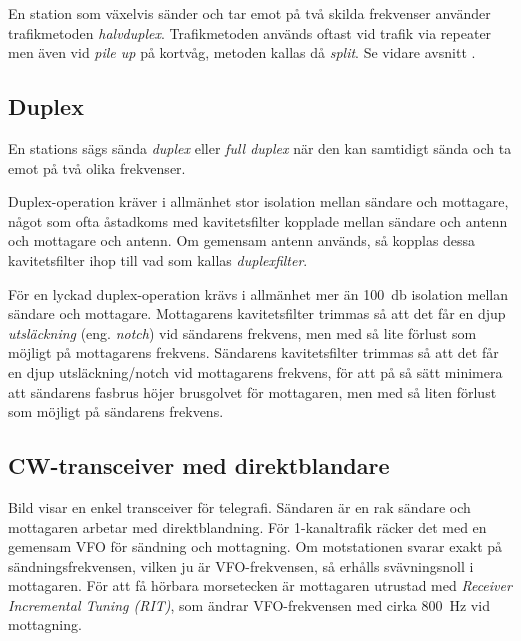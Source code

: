 En station som växelvis sänder och tar emot på två skilda frekvenser använder
trafikmetoden \emph{halvduplex}.
Trafikmetoden används oftast vid trafik via repeater men även vid \emph{pile up}
på kortvåg, metoden kallas då \emph{split}.
Se vidare avsnitt .

\subsection{Duplex}
\label{duplex}

En stations sägs sända \emph{duplex} eller \emph{full duplex} när den kan
samtidigt sända och ta emot på två olika frekvenser.

Duplex-operation kräver i allmänhet stor isolation mellan sändare och mottagare,
något som ofta åstadkoms med kavitetsfilter kopplade mellan sändare och antenn
och mottagare och antenn.
Om gemensam antenn används, så kopplas dessa kavitetsfilter ihop till vad som
kallas \emph{duplexfilter}.

För en lyckad duplex-operation krävs i allmänhet mer än \qty{100}{\decibel}
isolation mellan sändare och mottagare.
Mottagarens kavitetsfilter trimmas så att det får en djup \emph{utsläckning}
(eng. \emph{notch}) vid sändarens frekvens, men med så lite förlust som möjligt
på mottagarens frekvens.
Sändarens kavitetsfilter trimmas så att det får en djup utsläckning/notch vid
mottagarens frekvens, för att på så sätt minimera att sändarens fasbrus höjer
brusgolvet för mottagaren, men med så liten förlust som möjligt på sändarens
frekvens.

\subsection{CW-transceiver med direktblandare}

Bild  visar en enkel transceiver för telegrafi.
Sändaren är en rak sändare och mottagaren arbetar med direktblandning.
För 1-kanaltrafik räcker det med en gemensam VFO för sändning och mottagning.
Om motstationen svarar exakt på sändningsfrekvensen, vilken ju är
VFO-frekvensen, så erhålls svävningsnoll i mottagaren.
För att få hörbara morsetecken är mottagaren utrustad med
\emph{Receiver Incremental Tuning (RIT)}, som ändrar VFO-frekvensen med
cirka \qty{800}{\hertz} vid mottagning.

